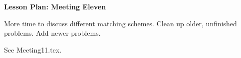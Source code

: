 \documentclass[12pt]{amsart}
\theoremstyle{definition}
\begin{document}
\begin{center}
\textbf{\Huge
Lesson Plan: Meeting Eleven
}
\end{center}
\vspace{.5in}

More time to discuss different matching schemes.
Clean up older, unfinished problems.
Add newer problems.

See Meeting11.tex.
\end{document}
